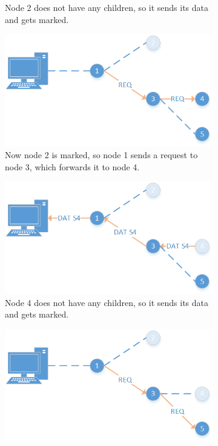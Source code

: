\begin{figure}[htbp]
\begin{subfigure}[t]{0.4\textwidth}
        \caption{Node 2 does not have any children, so it sends its data and gets marked.}
        \label{fig:coll2}
    \end{subfigure}
    \quad
    \quad
    \begin{subfigure}[t]{0.4\textwidth}
		\centering         
        \includegraphics[scale=0.6]{content/images/Collection/Part3}
        \caption{Now node 2 is marked, so node 1 sends a request to node 3, which forwards it to node 4.}
        \label{fig:coll3}
    \end{subfigure}
    \quad
    \quad
    \begin{subfigure}[t]{0.4\textwidth}
		\centering         
        \includegraphics[scale=0.6]{content/images/Collection/Part4}
        \caption{Node 4 does not have any children, so it sends its data and gets marked.}
        \label{fig:coll4}
    \end{subfigure}
    \quad
    \quad
    \begin{subfigure}[t]{0.4\textwidth}
		\centering         
        \includegraphics[scale=0.6]{content/images/Collection/Part5}

\end{subfigure}
\end{figure}
